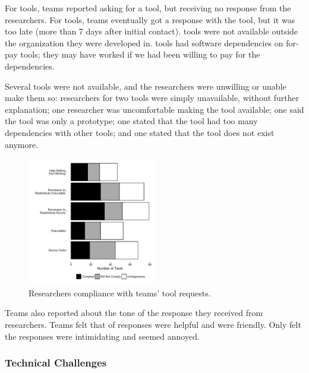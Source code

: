 \documentclass[10pt,conference]{IEEEtran}
\begin{document}
For \unworkNoResponseToAsk tools, teams reported asking for a tool,
but receiving no response from the researchers.
For \unworkTooLate tools, teams eventually got a response with the tool, 
but it was  too late (more than 7 days after initial contact).
\unworkInternal tools were not available outside the organization
they were developed in.
\unworkPay tools had software dependencies on for-pay tools; 
they may have worked if we had been willing to pay 
for the dependencies.

Several tools were not available, 
and the researchers were unwilling or unable make them so:
researchers for two tools were simply unavailable,
without further explanation; 
one researcher was uncomfortable making the tool available;
one said the tool was only a prototype;
one stated that the tool had too many dependencies with other tools;
and one stated that the tool does not exist anymore.

\begin{figure}[!t]
  \centering
    \includegraphics[width=0.5\textwidth]{requestPlot.pdf}
  \caption{Researchers compliance with teams' tool requests.}\label{fig:requests}
\end{figure}


Teams also reported about the tone of the response they received from 
researchers.
Teams felt that \emailsHelpful of responses were helpful and
\emailsFriendly were friendly.
Only \emailsIntimidating felt the responses were intimidating
and \emailsAnnoyed seemed annoyed.                                                                                                              


\subsubsection{Technical Challenges}
\end{document}
